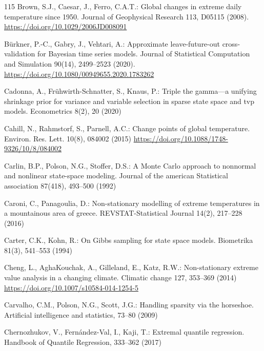 \documentclass[11pt,a4paper]{article}
\begin{document}
\begin{thebibliography}{115}
		Brown, S.J., Caesar, J., Ferro, C.A.T.: Global changes in extreme daily temperature since 1950. Journal of Geophysical Research 113, D05115 (2008). \url{https://doi.org/10.1029/2006JD008091}
		
		Bürkner, P.-C., Gabry, J., Vehtari, A.: Approximate leave-future-out cross-validation for Bayesian time series models. Journal of Statistical Computation and Simulation 90(14), 2499--2523 (2020). \url{https://doi.org/10.1080/00949655.2020.1783262}
		
		Cadonna, A., Frühwirth-Schnatter, S., Knaus, P.: Triple the gamma---a unifying shrinkage prior for variance and variable selection in sparse state space and tvp models. Econometrics 8(2), 20 (2020)
		
		Cahill, N., Rahmstorf, S., Parnell, A.C.: Change points of global temperature. Environ. Res. Lett. 10(8), 084002 (2015) \url{https://doi.org/10.1088/1748-9326/10/8/084002}
		
		Carlin, B.P., Polson, N.G., Stoffer, D.S.: A Monte Carlo approach to nonnormal and nonlinear state-space modeling. Journal of the american Statistical association 87(418), 493--500 (1992)
		
		Caroni, C., Panagoulia, D.: Non-stationary modelling of extreme temperatures in a mountainous area of greece. REVSTAT-Statistical Journal 14(2), 217--228 (2016)
		
		Carter, C.K., Kohn, R.: On Gibbs sampling for state space models. Biometrika 81(3), 541--553 (1994)
		
		Cheng, L., AghaKouchak, A., Gilleland, E., Katz, R.W.: Non-stationary extreme value analysis in a changing climate. Climatic change 127, 353--369 (2014) \url{https://doi.org/10.1007/s10584-014-1254-5}
		
		Carvalho, C.M., Polson, N.G., Scott, J.G.: Handling sparsity via the horseshoe. Artificial intelligence and statistics, 73--80 (2009)
		
		Chernozhukov, V., Fernández-Val, I., Kaji, T.: Extremal quantile regression. Handbook of Quantile Regression, 333--362 (2017)
		

\end{thebibliography}
\end{document}
